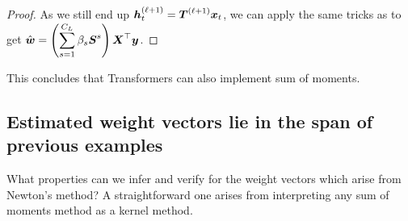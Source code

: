 \begin{proof}
As we still end up $\boldsymbol{h}_t^{(\ell+1)} = \boldsymbol{T}^{(\ell+1)} \boldsymbol{x}_t$, we can apply the same tricks as  to get $\displaystyle \hat{\boldsymbol{w}} = \left(\sum_{s=1}^{C_{L}} \beta_s \boldsymbol{S}^s\right) \boldsymbol{X}^\top \boldsymbol{y}$.  
\end{proof}
This concludes that Transformers can also implement sum of moments.

\fi

\subsection{Estimated weight vectors lie in the span of previous examples} \label{app:span}

What properties can we infer and verify for the weight vectors which arise from Newton's method? A straightforward one arises from interpreting any sum of moments method as a kernel method. 

